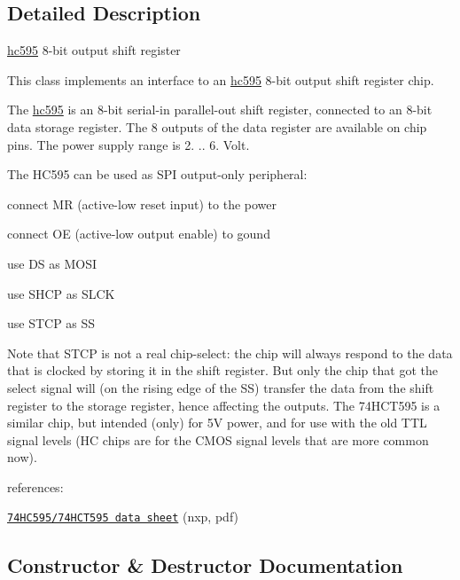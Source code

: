 \subsection{Detailed Description}
\hyperlink{classhwlib_1_1hc595}{hc595} 8-\/bit output shift register 

This class implements an interface to an \hyperlink{classhwlib_1_1hc595}{hc595} 8-\/bit output shift register chip.



The \hyperlink{classhwlib_1_1hc595}{hc595} is an 8-\/bit serial-\/in parallel-\/out shift register, connected to an 8-\/bit data storage register. The 8 outputs of the data register are available on chip pins. The power supply range is 2. .. 6. Volt.



The H\+C595 can be used as S\+PI output-\/only peripheral\+:
\begin{DoxyItemize}
\item connect MR (active-\/low reset input) to the power
\item connect OE (active-\/low output enable) to gound
\item use DS as M\+O\+SI
\item use S\+H\+CP as S\+L\+CK
\item use S\+T\+CP as SS
\end{DoxyItemize}

Note that S\+T\+CP is not a real chip-\/select\+: the chip will always respond to the data that is clocked by storing it in the shift register. But only the chip that got the select signal will (on the rising edge of the SS) transfer the data from the shift register to the storage register, hence affecting the outputs. The 74\+H\+C\+T595 is a similar chip, but intended (only) for 5V power, and for use with the old T\+TL signal levels (HC chips are for the C\+M\+OS signal levels that are more common now).

references\+:
\begin{DoxyItemize}
\item \href{https://www.nxp.com/documents/data_sheet/74HC_HCT595.pdf}{\tt 74\+H\+C595/74\+H\+C\+T595 data sheet} (nxp, pdf) 
\end{DoxyItemize}

\subsection{Constructor \& Destructor Documentation}
